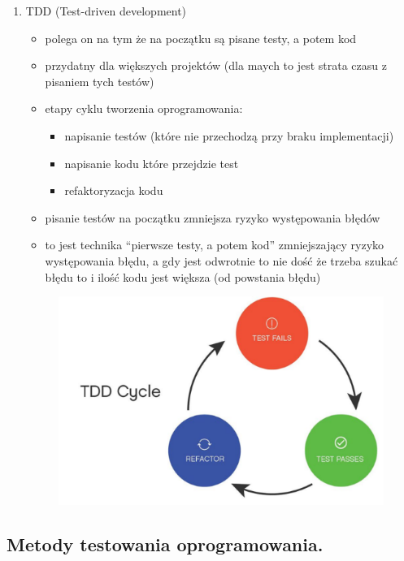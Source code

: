 \documentclass[a4paper,12pt,oneside]{book}
\begin{document}
\begin{enumerate}
\begin{figure}[h!]
				\end{figure}
				\item TDD (Test-driven development)
				\begin{itemize}
					\item polega on na tym że na początku są pisane testy, a potem kod
					\item przydatny dla większych projektów (dla maych to jest strata czasu z pisaniem
					tych testów)
					\item etapy cyklu tworzenia oprogramowania:
					\begin{itemize}
						\item napisanie testów (które nie przechodzą przy braku implementacji)
						\item napisanie kodu które przejdzie test
						\item refaktoryzacja kodu
					\end{itemize}
					\item pisanie testów na początku zmniejsza ryzyko występowania błędów
					\item to jest technika “pierwsze testy, a potem kod” zmniejszający ryzyko
					występowania błędu, a gdy jest odwrotnie to nie dość że trzeba szukać błędu
					to i ilość kodu jest większa (od powstania błędu)
				\end{itemize}
				\begin{figure}[h!]
					\centering\includegraphics[scale=0.6]{tdd.png}
				\end{figure}
				\end{enumerate}
			\newpage\subsection{\color{red}Metody testowania oprogramowania.}
\end{document}
